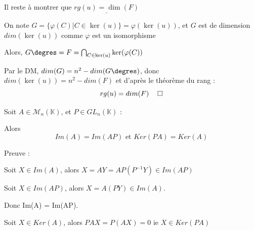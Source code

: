 Il reste à montrer que $\underline{rg(u) = \dim(F)}$




On note $G = \{\varphi(C)| C \in \ker(u)\} = \varphi(\ker(u))$, 
et $G$ est de dimension $dim(\ker(u))$ comme $\varphi$ est un isomorphisme

Alors, $G\degres = F = \bigcap_{C \in \ker(u)}\ker(\varphi(C))$

Par le DM, $dim(G) = n^2 - dim(G\degres)$, donc $dim(\ker(u)) = n^2 - dim(F)$ et d'après le théorème du rang : 
$$rg(u) = dim(F) \hspace{12px} \square$$

Soit $A \in \mathcal{M}_n(\mathbb{K})$, 
et $P \in GL_n(\mathbb{K})$ : 

Alors $$Im(A) = Im(AP) \text{ et } Ker(PA) = Ker(A)$$ 

Preuve : 

Soit $X \in Im(A)$, alors $X = AY = AP(P^{-1}Y) \in Im(AP)$

Soit $X \in Im(AP)$, alors $X = A(PY) \in Im(A)$.

Donc Im(A) = Im(AP).

Soit $X \in Ker(A)$, alors $PAX = P(AX) = 0 \text{ ie } X \in Ker(PA)$